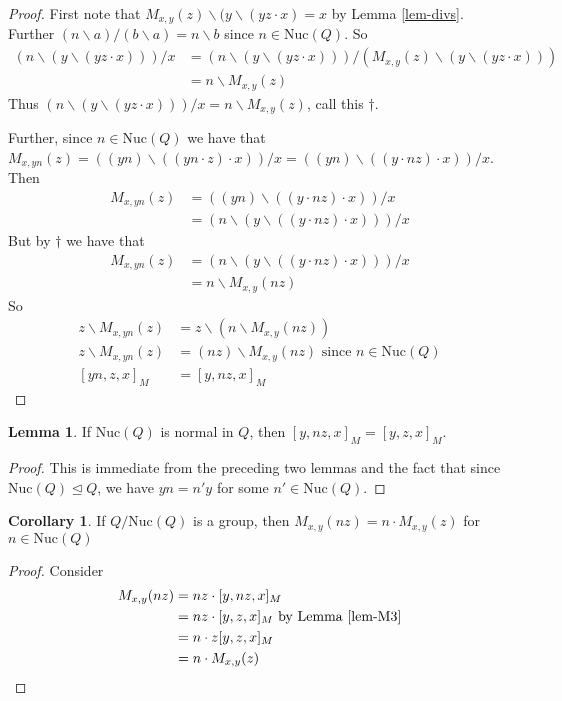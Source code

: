 \documentclass[12pt]{report}
\theoremstyle{definition}
\newtheorem{lem}[thm]{Lemma}
\newtheorem{cor}[thm]{Corollary}
\newcommand{\ldv}{\backslash}       %
\newcommand{\rdv}{/}                %
\newcommand{\nuc}{\text{Nuc}}       %
\begin{document}
\begin{proof}
  First note that $M_{x, y}(z)\ldv(y\ldv(yz\cdot x) = x$ by Lemma \ref{lem-divs}.
    Further $(n\ldv a)\rdv(b\ldv a) = n\ldv b$ since $n\in\nuc(Q)$. So
  \begin{align*}
    (n\ldv (y\ldv(yz\cdot x)))\rdv x &= (n\ldv (y\ldv(yz\cdot x)))\rdv(M_{x, y}(z)\ldv (y\ldv(yz\cdot x)))\\
    &= n\ldv M_{x, y}(z)
  \end{align*}
  Thus $(n\ldv (y\ldv(yz\cdot x)))\rdv x = n\ldv M_{x, y}(z)$, call this $\dagger$.

  Further, since $n\in \nuc(Q)$ we have that
    $M_{x, yn}(z) = ((yn)\ldv((yn\cdot z)\cdot x))\rdv x = ((yn)\ldv((y\cdot nz)\cdot x))\rdv x$.
    Then
  \begin{align*}
    M_{x, yn}(z) &= ((yn)\ldv((y\cdot nz)\cdot x))\rdv x\\
    &= (n\ldv(y\ldv((y\cdot nz)\cdot x)))\rdv x
  \end{align*}
  But by $\dagger$ we have that
  \begin{align*}
    M_{x, yn}(z) &= (n\ldv(y\ldv((y\cdot nz)\cdot x)))\rdv x\\
    &= n\ldv M_{x, y}(nz)
  \end{align*}
  So
  \begin{align*}
    z\ldv M_{x, yn}(z) &= z\ldv(n\ldv M_{x, y}(nz))\\
    z\ldv M_{x, yn}(z) &= (nz)\ldv M_{x, y}(nz)\text{ since $n\in\nuc(Q)$}\\
    [yn, z, x]_M &= [y, nz, x]_M
  \end{align*}
\end{proof}

\begin{lem}\label{lem-M3}
  If $\nuc(Q)$ is normal in $Q$, then $[y, nz, x]_M = [y, z, x]_M$.
\end{lem}

\begin{proof}
  This is immediate from the preceding two lemmas and the fact that since $\nuc(Q)\unlhd Q$,
    we have $yn = n'y$ for some $n'\in\nuc(Q)$.
\end{proof}

\begin{cor}\label{cor-M}
  If $Q/\nuc(Q)$ is a group, then $M_{x, y}(nz) = n\cdot M_{x, y}(z)$ for $n\in\nuc(Q)$
\end{cor}

\begin{proof}
  Consider
  \begin{align*}
    M_{x, y}(nz) &= nz\cdot [y, nz, x]_M\\
    &= nz\cdot [y, z, x]_M\text{ by Lemma \ref{lem-M3}}\\
    &= n\cdot z[y, z, x]_M\\
    &= n\cdot M_{x, y}(z)
  \end{align*}
\end{proof}
\end{document}

